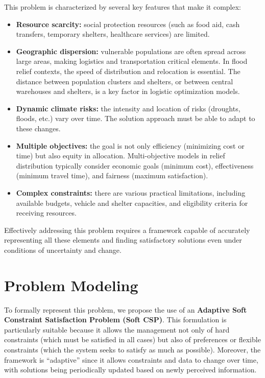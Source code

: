 \documentclass[letterpaper]{article}
\begin{document}
This problem is characterized by several key features that make it
complex:
\begin{itemize}
    \item \textbf{Resource scarcity:} social protection resources
          (such as food aid, cash transfers, temporary shelters, healthcare
          services) are limited.
    \item \textbf{Geographic dispersion:} vulnerable populations are
          often spread across large areas, making logistics and
          transportation critical elements. In flood relief contexts, the
          speed of distribution and relocation is essential. The distance
          between population clusters and shelters, or between central
          warehouses and shelters, is a key factor in logistic optimization
          models.
    \item \textbf{Dynamic climate risks:} the intensity and location
          of risks (droughts, floods, etc.) vary over time. The solution
          approach must be able to adapt to these changes.
    \item \textbf{Multiple objectives:} the goal is not only
          efficiency (minimizing cost or time) but also equity in
          allocation. Multi-objective models in relief distribution
          typically consider economic goals (minimum cost), effectiveness
          (minimum travel time), and fairness (maximum satisfaction).
    \item \textbf{Complex constraints:} there are various practical
          limitations, including available budgets, vehicle and shelter
          capacities, and eligibility criteria for receiving resources.
\end{itemize}

Effectively addressing this problem requires a framework capable of
accurately representing all these elements and finding satisfactory
solutions even under conditions of uncertainty and change.

\section{Problem Modeling}
To formally represent this problem, we propose the use of an \textbf{Adaptive Soft Constraint Satisfaction Problem (Soft CSP)}. This formulation is particularly suitable because it allows the management not only of hard constraints (which must be satisfied in all cases) but also of preferences or flexible constraints (which the system seeks to satisfy as much as possible). Moreover, the framework is “adaptive” since it allows constraints and data to change over time, with solutions being periodically updated based on newly perceived information.
\end{document}
